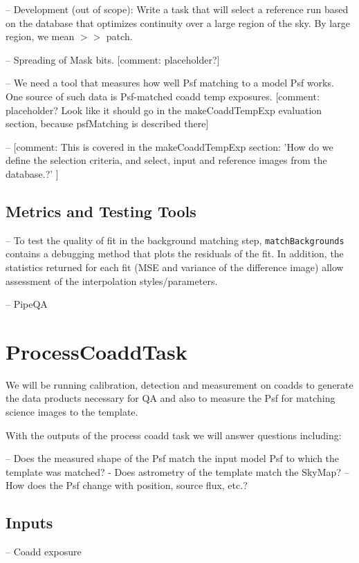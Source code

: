 \documentclass[12pt]{article}
\newcommand{\comment}[1]{{\color{cyan} [{comment: #1}]}}
\begin{document}
-- Development (out of scope): Write a task that will select a reference run based on the database that optimizes continuity over a large region of the sky. By large region, we mean $>>$ patch. 

-- Spreading of Mask bits.  \comment{placeholder?}

-- We need a tool that measures how well Psf matching to a model Psf
works. One source of such data is Psf-matched coadd temp exposures. \comment{placeholder? Look like it should go in the makeCoaddTempExp evaluation section, because psfMatching is described there}

-- \comment{This is covered in the makeCoaddTempExp section:  'How do we define the selection criteria, and select, input and reference images from the database.?' }

\subsection{Metrics and Testing Tools}

-- To test the quality of fit in the background matching step, {\tt matchBackgrounds} contains a debugging method that plots the residuals of the fit.  In addition, the statistics returned for each fit (MSE and variance of the difference image) allow assessment of the interpolation styles/parameters.

-- PipeQA


\clearpage 
\section{ProcessCoaddTask} 
We will be running calibration, detection and measurement on coadds to 
generate the data products necessary for QA and also to measure the Psf
for matching science images to the template.

With the outputs of the process coadd task we will answer questions including:

-- Does the measured shape of the Psf match the input model Psf to which the template was matched?
- Does astrometry of the template match the SkyMap?
-- How does the Psf change with position, source flux, etc.?

\subsection{Inputs}

-- Coadd exposure
\end{document}
